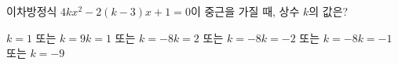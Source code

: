 이차방정식 $4kx^2-2(k-3)x+1=0$이 중근을 가질 때, 상수 $k$의 값은?
\begin{choices32}{$k=1$ 또는 $k=9$}{$k=1$ 또는 $k=-8$}{$k=2$ 또는 $k=-8$}{$k=-2$ 또는 $k=-8$}{$k=-1$ 또는 $k=-9$}\end{choices32}
